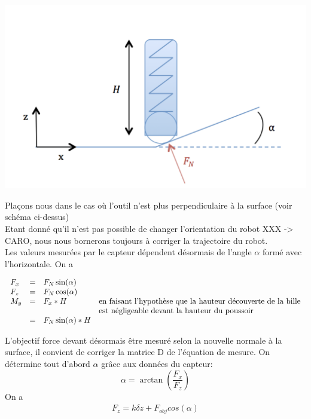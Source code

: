 \documentclass[12pt,twoside,a4paper]{article}
\begin{document}
\begin{center}
\includegraphics[scale=0.5]{schema_Kalman.png}
\end{center}


\vspace{1cm}
Plaçons nous dans le cas où l'outil n'est plus perpendiculaire à la surface (voir schéma ci-dessus)\\

Etant donné qu'il n'est pas possible de changer l'orientation du robot XXX -> CARO, nous nous bornerons toujours à corriger la trajectoire du robot. \\

\vspace{1cm}
Les valeurs mesurées par le capteur dépendent désormais de l'angle $\alpha$ formé avec l'horizontale. On a

$$
\begin{array}{lllll}
F_x &=& F_N \sin(\alpha) &\\
F_z &=& F_N \cos(\alpha) &\\
M_y &= &F_x*H & \text{en faisant l'hypothèse que la hauteur découverte de la bille} \\
	&&& \text{est négligeable devant la hauteur du poussoir} \\
	&= &F_N \sin(\alpha)*H &
	\begin{array}[t]{l}

	\end{array}
\end{array}
$$

L'objectif force devant désormais être mesuré selon la nouvelle normale à la surface, il convient de corriger la matrice D de l'équation de mesure.
On détermine tout d'abord $\alpha$ grâce aux données du capteur:
$$ \alpha = \arctan(\frac{F_{x}}{F_{z}}) $$
On a
$$
\begin{array}{lll}
F_{z} = k \delta z + F_{obj} cos(\alpha)
\end{array}
$$
\end{document}
